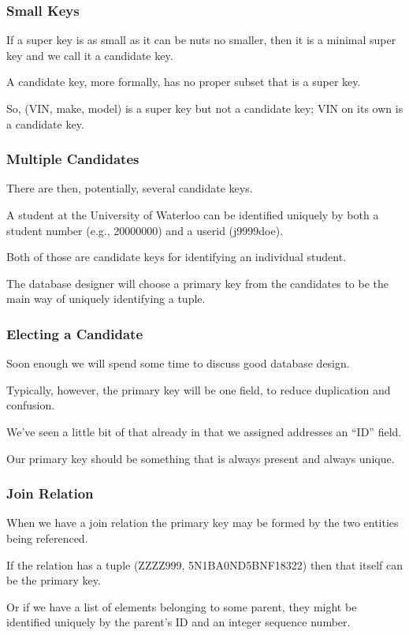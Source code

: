 \begin{frame}
\frametitle{Small Keys}

If a super key is as small as it can be nuts no smaller, then it is a minimal super key and we call it a \alert{candidate key}. 

A candidate key, more formally, has no proper subset that is a super key. 

So, (VIN, make, model) is a super key but not a candidate key; VIN on its own is a candidate key.

\end{frame}



\begin{frame}
\frametitle{Multiple Candidates}

There are then, potentially, several candidate keys. 

A student at the University of Waterloo can be identified uniquely by both a student number (e.g., 20000000) and a userid (j9999doe). 

Both of those are candidate keys for identifying an individual student. 

The database designer will choose a \alert{primary key} from the candidates to be the main way of uniquely identifying a tuple. 


\end{frame}



\begin{frame}
\frametitle{Electing a Candidate}

Soon enough we will spend some time to discuss good database design. 

Typically, however, the primary key will be one field, to reduce duplication and confusion. 

We've seen a little bit of that already in that we assigned addresses an ``ID'' field. 

Our primary key should be something that is always present and always unique.

\end{frame}




\begin{frame}
\frametitle{Join Relation}

When we have a join relation the primary key may be formed by the two entities being referenced. 

If the relation has a tuple (ZZZZ999, 5N1BA0ND5BNF18322) then that itself can be the primary key. 

Or if we have a list of elements belonging to some parent, they might be identified uniquely by the parent's ID and an integer sequence number.

\end{frame}




